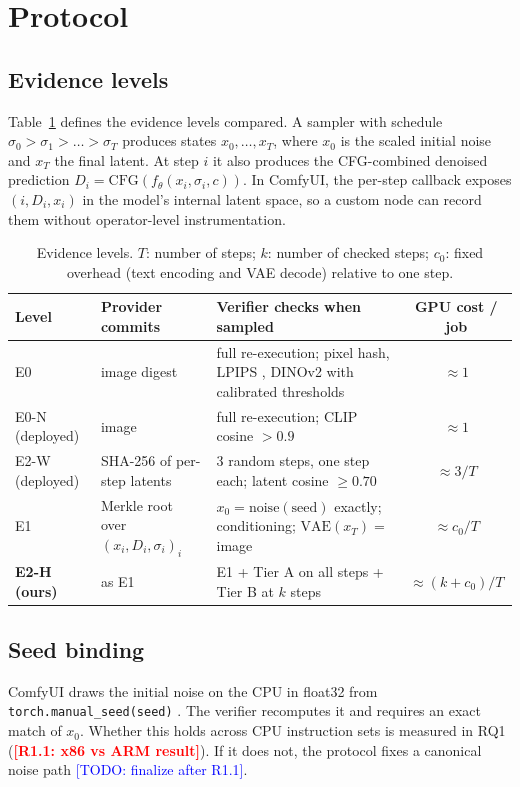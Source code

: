 \documentclass[preprint,review,12pt,authoryear]{elsarticle}
\newcommand{\res}[1]{\textcolor{red}{\textbf{[#1]}}}          %
\newcommand{\todo}[1]{\textcolor{blue}{[TODO: #1]}}            %
\theoremstyle{definition}
\begin{document}
\section{Protocol}\label{sec:protocol}

\subsection{Evidence levels}
Table~\ref{tab:evidence} defines the evidence levels compared. A sampler with schedule $\sigma_0>\sigma_1>\dots>\sigma_T$ produces states $x_0,\dots,x_T$, where $x_0$ is the scaled initial noise and $x_T$ the final latent. At step $i$ it also produces the CFG-combined denoised prediction $D_i=\mathrm{CFG}(f_\theta(x_i,\sigma_i,c))$. In ComfyUI, the per-step callback exposes $(i, D_i, x_i)$ in the model's internal latent space, so a custom node can record them without operator-level instrumentation.

\begin{table}[t]
\centering\small
\caption{Evidence levels. $T$: number of steps; $k$: number of checked steps; $c_0$: fixed overhead (text encoding and VAE decode) relative to one step.}\label{tab:evidence}
\begin{tabularx}{\linewidth}{lXXc}
\toprule
Level & Provider commits & Verifier checks when sampled & GPU cost / job \\
\midrule
E0 & image digest & full re-execution; pixel hash, LPIPS \citep{zhang2018lpips}, DINOv2 \citep{oquab2023dinov2} with calibrated thresholds & $\approx1$ \\
E0-N (deployed) & image & full re-execution; CLIP \citep{radford2021clip} cosine $>0.9$ & $\approx1$ \\
E2-W (deployed) & SHA-256 of per-step latents & 3 random steps, one step each; latent cosine $\ge0.70$ & $\approx3/T$ \\
E1 & Merkle root over $(x_i,D_i,\sigma_i)_{i}$ & $x_0=\mathrm{noise}(\text{seed})$ exactly; conditioning; $\mathrm{VAE}(x_T)=$ image & $\approx c_0/T$ \\
\textbf{E2-H (ours)} & as E1 & E1 + Tier A on all steps + Tier B at $k$ steps & $\approx (k+c_0)/T$ \\
\bottomrule
\end{tabularx}
\end{table}

\subsection{Seed binding}
ComfyUI draws the initial noise on the CPU in float32 from \texttt{torch.manual\_seed(seed)} \citep{comfyui}. The verifier recomputes it and requires an exact match of $x_0$. Whether this holds across CPU instruction sets is measured in RQ1 (\res{R1.1: x86 vs ARM result}). If it does not, the protocol fixes a canonical noise path \todo{finalize after R1.1}.
\end{document}
